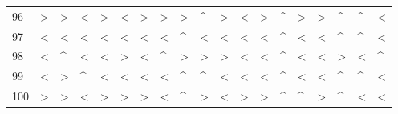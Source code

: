 \begin{tabular}{lllllllllllllllllll}
96  &  > &  > &  < &  > &  < &  > &  > &  > &  \textasciicircum  &  > &  < &  > &  \textasciicircum  &  > &  > &  \textasciicircum  &  \textasciicircum  &  < \\
97  &  < &  < &  < &  < &  < &  < &  < &  \textasciicircum  &  < &  < &  < &  < &  \textasciicircum  &  < &  < &  \textasciicircum  &  \textasciicircum  &  < \\
98  &  < &  \textasciicircum  &  < &  < &  > &  < &  \textasciicircum  &  > &  > &  > &  < &  < &  \textasciicircum  &  < &  < &  > &  < &  \textasciicircum  \\
99  &  < &  > &  \textasciicircum  &  < &  < &  < &  < &  \textasciicircum  &  \textasciicircum  &  < &  < &  < &  \textasciicircum  &  < &  < &  \textasciicircum  &  \textasciicircum  &  < \\
100 &  > &  > &  < &  > &  > &  > &  < &  \textasciicircum  &  > &  < &  > &  > &  \textasciicircum  &  \textasciicircum  &  > &  \textasciicircum  &  < &  < \\
\bottomrule
\end{tabular}
